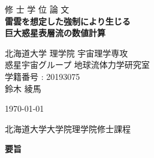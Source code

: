 \documentclass[a4j,12pt,openbib,oneside]{jreport}
\begin{document}
\begin{titlepage}
 \centering
 \vspace*{40truept}
 {\Huge 修 \hspace{10pt} 士 \hspace{10pt} 学 \hspace{10pt} 位
 \hspace{10pt} 論 \hspace{10pt} 文}\\  %
 \vspace*{50truept}
 \textbf{{\Huge 雷雲を想定した強制により生じる\\
巨大惑星表層流の数値計算}} \\ %
 \vspace{30truept}
 \vspace{150truept}
 \begin{center}
  {\Large 北海道大学 理学院 宇宙理学専攻}
  \vspace{10truept}\\
  {\Large 惑星宇宙グループ 地球流体力学研究室}
  \vspace{10truept}\\
  {\Large 学籍番号 : 20193075} 
  \vspace{30truept}\\
  {\LARGE 鈴木 綾馬}
  \vspace{10truept}
 \end{center}
 \begin{center}
  {\Large \today}
 \end{center}
 \vspace{50truept}
 {\Large 北海道大学大学院理学院修士課程} \\
\end{titlepage}


\thispagestyle{empty}
\setcounter{page}{0}

%
\clearpage
\begin{center}
\large{\bf 要旨}
\end{center}
\thispagestyle{empty}

%
%
\clearpage
\thispagestyle{empty}
\setcounter{page}{0}
\setcounter{tocdepth}{3}
\tableofcontents 
\thispagestyle{empty}
\setcounter{page}{0}
\end{document}
